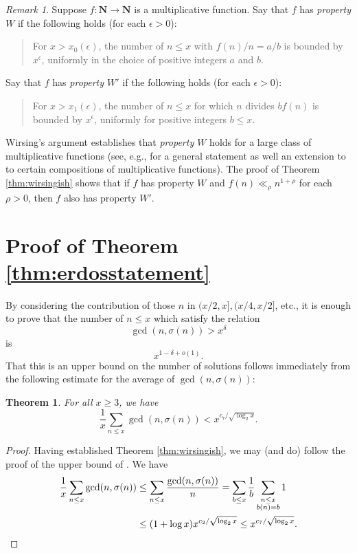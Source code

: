 \documentclass[12pt]{amsart}
\newtheorem{thm}{Theorem}
\theoremstyle{definition}
\theoremstyle{remark}
\newtheorem*{rem}{Remark}
\newcommand{\N}{\mathbf{N}}
\begin{document}
\begin{rem} Suppose $f\colon \N\to\N$ is a multiplicative function. Say that $f$ has \emph{property $W$} if the following holds (for each $\epsilon > 0$):
\begin{quote} For $x > x_0(\epsilon)$, the number of $n \leq x$ with $f(n)/n = a/b$ is bounded by $x^{\epsilon}$, uniformly in the choice of positive  integers $a$ and $b$.\end{quote}
Say that $f$ has \emph{property $W'$} if the following holds (for each $\epsilon > 0$):
\begin{quote} For $x > x_1(\epsilon)$, the number of $n \leq x$ for which $n$ divides $bf(n)$ is bounded by $x^{\epsilon}$, uniformly for positive integers $b \leq x$.\end{quote}
Wirsing's argument establishes that \emph{property $W$} holds for a large class of multiplicative functions (see, e.g., \cite{lucht76} for a general statement as well an extension to to certain compositions of multiplicative functions). The proof of Theorem \ref{thm:wirsingish} shows that if $f$ has property $W$ and $f(n) \ll_{\rho} n^{1+\rho}$ for each $\rho
 > 0$, then $f$ also has property $W'$.
\end{rem}


\section{Proof of Theorem \ref{thm:erdosstatement}}
By considering the contribution of those $n$ in $(x/2, x], (x/4, x/2]$, etc., it is enough to prove that the number of $n\leq x$ which satisfy the relation \begin{equation}\label{eq:erdosmodified} \gcd(n,\sigma(n)) > x^{\delta} \end{equation} is \[ x^{1-\delta + o(1)}.\] That this is an upper bound on the number of solutions follows immediately from the following estimate for the average of $\gcd(n,\sigma(n))$:
\begin{thm}\label{thm:gcd} For all $x\geq 3$, we have
\[ \frac{1}{x}\sum_{n \leq x} \gcd(n,\sigma(n)) < x^{c_7/\sqrt{\log_2{x}}}. \]
\end{thm}
\begin{proof} Having established Theorem \ref{thm:wirsingish}, we may (and do) follow the proof of the upper bound of \cite[Theorem 11]{ELP08}. We have
\begin{align*} \frac{1}{x}\sum_{n \leq x} \gcd(n,\sigma(n)) &\leq \sum_{n \leq x} \frac{\gcd(n,\sigma(n))}{n} = \sum_{b \leq x} \frac{1}{b} \sum_{\substack{n\leq x\\ b(n)=b}}{1}\\ &\leq (1+\log{x}) x^{c_2/\sqrt{\log_2{x}}} \leq x^{c_7/\sqrt{\log_2{x}}}.  \qedhere \end{align*}
\end{proof}
\end{document}
